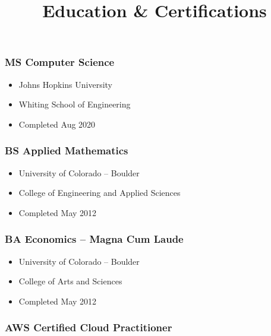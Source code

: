 \documentclass[]{article}
\title{Education \& Certifications}
\author{}
\date{\vspace{-2.5em}}
\providecommand{\tightlist}{%
  \setlength{\itemsep}{0pt}\setlength{\parskip}{0pt}}
\begin{document}
\maketitle

\hypertarget{ms-computer-science}{%
\subsubsection{MS Computer Science}\label{ms-computer-science}}

\begin{itemize}
\tightlist
\item
  Johns Hopkins University
\item
  Whiting School of Engineering
\item
  Completed Aug 2020
\end{itemize}

\hypertarget{bs-applied-mathematics}{%
\subsubsection{BS Applied Mathematics}\label{bs-applied-mathematics}}

\begin{itemize}
\tightlist
\item
  University of Colorado -- Boulder
\item
  College of Engineering and Applied Sciences
\item
  Completed May 2012
\end{itemize}

\hypertarget{ba-economics-magna-cum-laude}{%
\subsubsection{BA Economics -- Magna Cum
Laude}\label{ba-economics-magna-cum-laude}}

\begin{itemize}
\tightlist
\item
  University of Colorado -- Boulder
\item
  College of Arts and Sciences
\item
  Completed May 2012
\end{itemize}

\hypertarget{aws-certified-cloud-practitioner}{%
\subsubsection{AWS Certified Cloud
Practitioner}\label{aws-certified-cloud-practitioner}}
\end{document}
